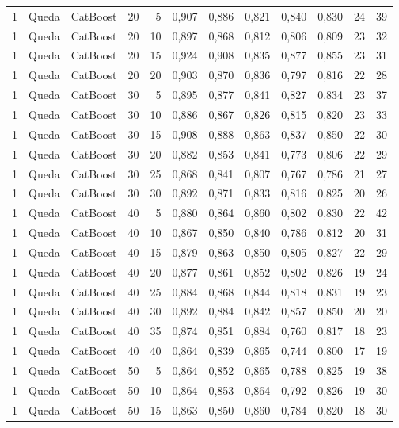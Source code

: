 \begin{longtable}{ccclrrrrrrrr}
1 & Queda & CatBoost & 20 & 5 & 0,907 & 0,886 & 0,821 & 0,840 & 0,830 & 24 & 39 \\
1 & Queda & CatBoost & 20 & 10 & 0,897 & 0,868 & 0,812 & 0,806 & 0,809 & 23 & 32 \\
1 & Queda & CatBoost & 20 & 15 & 0,924 & 0,908 & 0,835 & 0,877 & 0,855 & 23 & 31 \\
1 & Queda & CatBoost & 20 & 20 & 0,903 & 0,870 & 0,836 & 0,797 & 0,816 & 22 & 28 \\
1 & Queda & CatBoost & 30 & 5 & 0,895 & 0,877 & 0,841 & 0,827 & 0,834 & 23 & 37 \\
1 & Queda & CatBoost & 30 & 10 & 0,886 & 0,867 & 0,826 & 0,815 & 0,820 & 23 & 33 \\
1 & Queda & CatBoost & 30 & 15 & 0,908 & 0,888 & 0,863 & 0,837 & 0,850 & 22 & 30 \\
1 & Queda & CatBoost & 30 & 20 & 0,882 & 0,853 & 0,841 & 0,773 & 0,806 & 22 & 29 \\
1 & Queda & CatBoost & 30 & 25 & 0,868 & 0,841 & 0,807 & 0,767 & 0,786 & 21 & 27 \\
1 & Queda & CatBoost & 30 & 30 & 0,892 & 0,871 & 0,833 & 0,816 & 0,825 & 20 & 26 \\
1 & Queda & CatBoost & 40 & 5 & 0,880 & 0,864 & 0,860 & 0,802 & 0,830 & 22 & 42 \\
1 & Queda & CatBoost & 40 & 10 & 0,867 & 0,850 & 0,840 & 0,786 & 0,812 & 20 & 31 \\
1 & Queda & CatBoost & 40 & 15 & 0,879 & 0,863 & 0,850 & 0,805 & 0,827 & 22 & 29 \\
1 & Queda & CatBoost & 40 & 20 & 0,877 & 0,861 & 0,852 & 0,802 & 0,826 & 19 & 24 \\
1 & Queda & CatBoost & 40 & 25 & 0,884 & 0,868 & 0,844 & 0,818 & 0,831 & 19 & 23 \\
1 & Queda & CatBoost & 40 & 30 & 0,892 & 0,884 & 0,842 & 0,857 & 0,850 & 20 & 20 \\
1 & Queda & CatBoost & 40 & 35 & 0,874 & 0,851 & 0,884 & 0,760 & 0,817 & 18 & 23 \\
1 & Queda & CatBoost & 40 & 40 & 0,864 & 0,839 & 0,865 & 0,744 & 0,800 & 17 & 19 \\
1 & Queda & CatBoost & 50 & 5 & 0,864 & 0,852 & 0,865 & 0,788 & 0,825 & 19 & 38 \\
1 & Queda & CatBoost & 50 & 10 & 0,864 & 0,853 & 0,864 & 0,792 & 0,826 & 19 & 30 \\
1 & Queda & CatBoost & 50 & 15 & 0,863 & 0,850 & 0,860 & 0,784 & 0,820 & 18 & 30 \\

\end{longtable}
